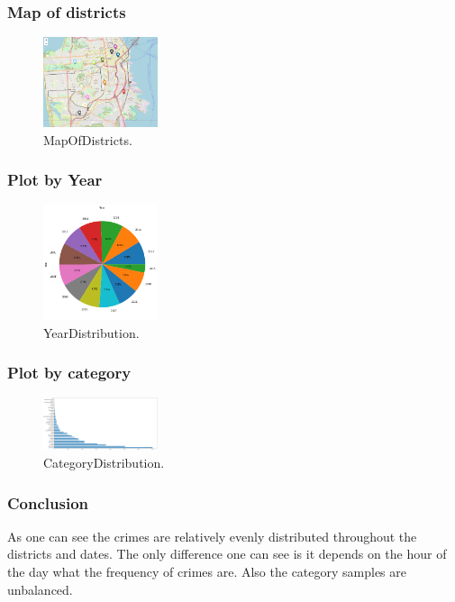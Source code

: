 \documentclass[../Main.tex]{subfiles}
\begin{document}
\subsubsection{Map of districts}
\begin{figure}[H]
\centering
\includegraphics[width=0.3\textwidth]{Resources/MapOfDistricts.png}
\caption{\label{fig:MapOfDistricts}MapOfDistricts.}
\end{figure}

\subsubsection{Plot by Year}
\begin{figure}[H]
\centering
\includegraphics[width=0.3\textwidth]{Resources/YearDistribution.png}
\caption{\label{fig:YearDistribution}YearDistribution.}
\end{figure}

\subsubsection{Plot by category}

\begin{figure}[H]
\centering
\includegraphics[width=0.3\textwidth]{Resources/CategoryDistribution.png}
\caption{\label{fig:CategoryDistribution}CategoryDistribution.}
\end{figure}




\subsubsection{Conclusion}
As one can see the crimes are relatively evenly distributed throughout the districts and dates. The only difference one can see is it depends on the hour of the day what the frequency of crimes are. Also the category samples are unbalanced.
\end{document}
